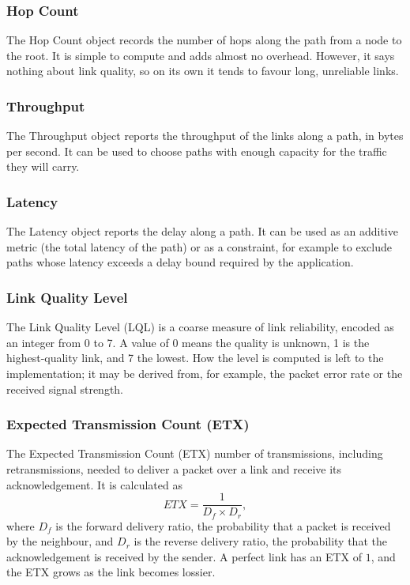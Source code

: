 \subsubsection{Hop Count}
The Hop Count object records the number of hops along the path from a node to
the root. It is simple to compute and adds almost no overhead. However, it
says nothing about link quality, so on its own it tends to favour long,
unreliable links.

\subsubsection{Throughput}
The Throughput object reports the throughput of the links along a path, in
bytes per second. It can be used to choose paths with enough capacity for
the
traffic they will carry.

\subsubsection{Latency}
The Latency object reports the delay along a path. It can be used as
an additive metric (the total latency of the path) or as a
constraint, for example to exclude paths whose latency exceeds a
delay bound required by the application.

\subsubsection{Link Quality Level}
The Link Quality Level (LQL) is a coarse measure of link reliability,
encoded as an integer from 0 to 7. A value of 0 means the quality is
unknown, 1 is the highest-quality link, and 7 the lowest. How the
level is computed is left to the implementation; it may be derived
from, for example, the packet error rate or the received signal strength.

\subsubsection{Expected Transmission Count (ETX)}
The Expected Transmission Count (ETX)
number of transmissions, including retransmissions, needed to deliver a
packet
over a link and receive its acknowledgement. It is calculated as
\begin{equation}
    \mathit{ETX} = \frac{1}{D_f \times D_r},
\end{equation}
where $D_f$ is the forward delivery ratio, the probability that a packet is
received by the neighbour, and $D_r$ is the reverse delivery ratio, the
probability that the acknowledgement is received by the sender. A perfect
link has an ETX of $1$, and the ETX grows as the link becomes lossier.

